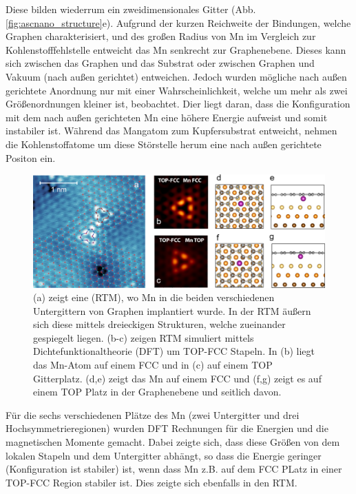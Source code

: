Diese bilden wiederrum ein zweidimensionales Gitter (Abb. \ref{fig:ascnano_structure}e).
Aufgrund der kurzen Reichweite der Bindungen, welche Graphen charakterisiert, und des großen Radius von Mn im Vergleich zur 
Kohlenstofffehlstelle entweicht das Mn senkrecht zur Graphenebene.
Dieses kann sich zwischen das Graphen und das Substrat oder zwischen Graphen und Vakuum (nach außen gerichtet) entweichen. 
Jedoch wurden mögliche nach außen gerichtete Anordnung nur mit einer Wahrscheinlichkeit, 
welche um mehr als zwei Größenordnungen kleiner ist, beobachtet.
Dier liegt daran, dass die Konfiguration mit dem nach außen gerichteten Mn eine höhere Energie aufweist und somit instabiler ist.
Während das Mangatom zum Kupfersubstrat entweicht, nehmen die Kohlenstoffatome um diese Störstelle herum eine nach außen gerichtete Positon ein.
\begin{figure}
    \centering
    \includegraphics[width = \textwidth]{Plots/images_large_nn1c00139_0003.jpeg}
    \caption{(a) zeigt eine (RTM), wo Mn in die beiden verschiedenen Untergittern von Graphen implantiert wurde. In der
    RTM äußern sich diese mittels dreieckigen Strukturen, welche zueinander gespiegelt liegen.
    (b-c) zeigen RTM simuliert mittels Dichtefunktionaltheorie (DFT) um TOP-FCC Stapeln. In (b) liegt das Mn-Atom auf einem FCC
    und in (c) auf einem TOP Gitterplatz. (d,e) zeigt das Mn auf einem FCC und (f,g) zeigt es auf einem TOP Platz in der Graphenebene und seitlich davon.}
    \label{fig:ascnano_defect}
\end{figure}
Für die sechs verschiedenen Plätze des Mn (zwei Untergitter und drei Hochsymmetrieregionen) wurden DFT Rechnungen für die Energien und die magnetischen Momente gemacht.
Dabei zeigte sich, dass diese Größen von dem lokalen Stapeln und dem Untergitter abhängt, so dass die Energie geringer (Konfiguration ist stabiler) ist, 
wenn dass Mn z.B. auf dem FCC PLatz in einer TOP-FCC Region stabiler ist.
Dies zeigte sich ebenfalls in den RTM. 
\FloatBarrier
